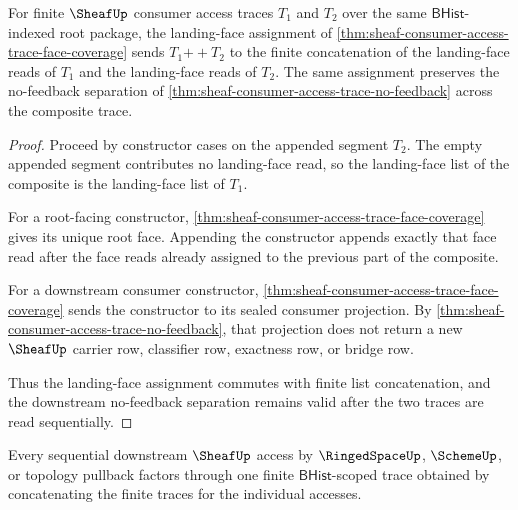 \begin{theorem}
\label{thm:sheaf-consumer-access-trace-face-map-stability}
For finite $\SheafUp$ consumer access traces $T_1$ and $T_2$ over the same $\mathsf{BHist}$-indexed root package, the landing-face assignment of \autoref{thm:sheaf-consumer-access-trace-face-coverage} sends $T_1 \mathbin{+\!\!+} T_2$ to the finite concatenation of the landing-face reads of $T_1$ and the landing-face reads of $T_2$. The same assignment preserves the no-feedback separation of \autoref{thm:sheaf-consumer-access-trace-no-feedback} across the composite trace.
\end{theorem}
\begin{proof}
Proceed by constructor cases on the appended segment $T_2$. The empty appended segment contributes no landing-face read, so the landing-face list of the composite is the landing-face list of $T_1$.

For a root-facing constructor, \autoref{thm:sheaf-consumer-access-trace-face-coverage} gives its unique root face. Appending the constructor appends exactly that face read after the face reads already assigned to the previous part of the composite.

For a downstream consumer constructor, \autoref{thm:sheaf-consumer-access-trace-face-coverage} sends the constructor to its sealed consumer projection. By \autoref{thm:sheaf-consumer-access-trace-no-feedback}, that projection does not return a new $\SheafUp$ carrier row, classifier row, exactness row, or bridge row.

Thus the landing-face assignment commutes with finite list concatenation, and the downstream no-feedback separation remains valid after the two traces are read sequentially.
\end{proof}
\begin{theorem}
\label{thm:sheaf-consumer-access-trace-composite-exhaustion}
Every sequential downstream $\SheafUp$ access by $\RingedSpaceUp$, $\SchemeUp$, or topology pullback factors through one finite $\mathsf{BHist}$-scoped trace obtained by concatenating the finite traces for the individual accesses.
\end{theorem}
